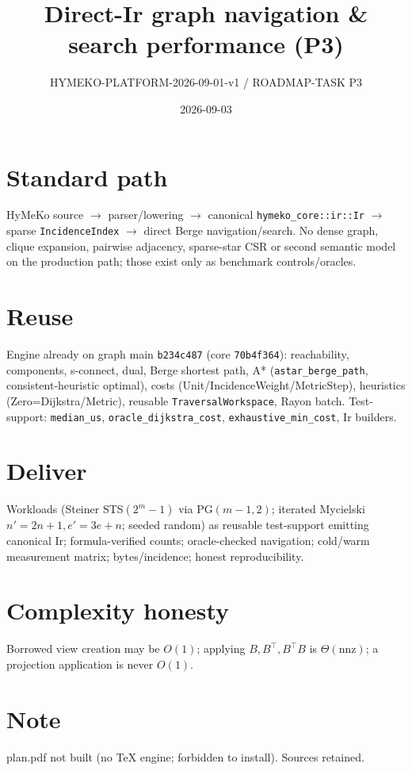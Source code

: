 \documentclass[11pt]{article}
\title{Direct-Ir graph navigation \& search performance (P3)}
\author{HYMEKO-PLATFORM-2026-09-01-v1 / ROADMAP-TASK P3}
\date{2026-09-03}
\begin{document}
\maketitle
\section{Standard path}
HyMeKo source $\to$ parser/lowering $\to$ canonical \texttt{hymeko\_core::ir::Ir} $\to$ sparse
\texttt{IncidenceIndex} $\to$ direct Berge navigation/search. No dense graph, clique expansion,
pairwise adjacency, sparse-star CSR or second semantic model on the production path; those exist
only as benchmark controls/oracles.
\section{Reuse}
Engine already on graph main \texttt{b234c487} (core \texttt{70b4f364}): reachability, components,
s-connect, dual, Berge shortest path, A* (\texttt{astar\_berge\_path}, consistent-heuristic optimal),
costs (Unit/IncidenceWeight/MetricStep), heuristics (Zero=Dijkstra/Metric), reusable
\texttt{TraversalWorkspace}, Rayon batch. Test-support: \texttt{median\_us},
\texttt{oracle\_dijkstra\_cost}, \texttt{exhaustive\_min\_cost}, Ir builders.
\section{Deliver}
Workloads (Steiner STS$(2^m-1)$ via PG$(m-1,2)$; iterated Mycielski $n'=2n+1,e'=3e+n$; seeded
random) as reusable test-support emitting canonical Ir; formula-verified counts; oracle-checked
navigation; cold/warm measurement matrix; bytes/incidence; honest reproducibility.
\section{Complexity honesty}
Borrowed view creation may be $O(1)$; applying $B,B^\top,B^\top B$ is $\Theta(\mathrm{nnz})$; a
projection application is never $O(1)$.
\section*{Note} plan.pdf not built (no TeX engine; forbidden to install). Sources retained.
\end{document}

